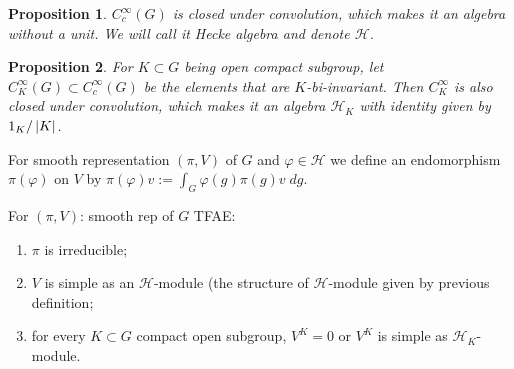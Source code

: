 \documentclass[pdf,notes]{beamer}
\theoremstyle{mystyle}
\newtheorem{prop}{Proposition}
\begin{document}
\begin{frame}
	\begin{prop}
		$C^{\infty}_c(G)$ is closed under convolution, which makes it an algebra without a unit.
		We will call it {\it Hecke algebra} and denote $\mathcal{H}$.
		\label{}
	\end{prop}
	\begin{prop}
		For $K\subset G$ being open compact subgroup, let $C^{\infty}_K(G)\subset C^{\infty}_c(G)$ be the elements that
		are $K$-bi-invariant. Then $C^{\infty}_K$ is also closed under convolution, which makes it an algebra $\mathcal{H}_K$
		with identity given by $1_K/\left|K\right|$.
		\label{}
	\end{prop}
\end{frame}
\begin{frame}
	\begin{definition}
		For smooth representation $(\pi,V)$ of $G$ and $\varphi\in\mathcal{H}$ we define an endomorphism
		$\pi(\varphi)$ on $V$ by $\pi(\varphi)v:=\int_G\varphi(g)\pi(g)v\;dg$.
	\end{definition}
	\begin{theorem}
		For $(\pi,V)$: smooth rep of $G$ TFAE:
		\begin{enumerate}
			\item $\pi$ is irreducible;
			\item $V$ is simple as an $\mathcal{H}$-module (the structure of $\mathcal{H}$-module given by previous
				definition;
			\item for every $K\subset G$ compact open subgroup, $V^{K}=0$ or $V^K$ is simple as $\mathcal{H}_K$-module.
		\end{enumerate}
		\label{}
	\end{theorem}
\end{frame}
\end{document}
